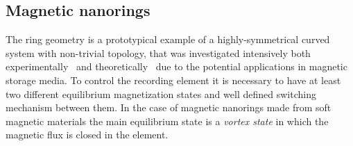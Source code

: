 \subsection{Magnetic nanorings} \label{subsec:Nanorings}

The ring geometry is a prototypical example of a highly-symmetrical curved system with non-trivial topology, that was investigated intensively both experimentally~\cite{Klaui01,Klaui03a,Klaui05a} and theoretically~\cite{Kravchuk09,Kravchuk11} due to the potential applications in magnetic storage media. To control the recording element it is necessary to have at least two different equilibrium magnetization states and well defined switching mechanism between them. In the case of magnetic nanorings made from soft magnetic materials the main equilibrium state is a \textit{vortex state} in which the magnetic flux is closed in the element.
